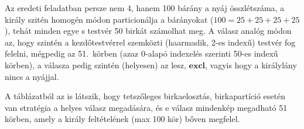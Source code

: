 \documentclass{article}
\newcommand{\just}[1]{\boxed{#1}}%
\newcommand{\excl}{\mathbf{excl}}
\begin{document}
	Az eredeti feladatban persze nem 4, hanem 100 bárány a nyáj összlétszáma, a király szitén homogén módon particionálja a bárányokat ($100 = 25+25+25+25$), tehát minden egye s testvér 50 birkát számolhat meg. A válasz analóg módon az, hogy szintén a kezdőtestvérrel szemközti (haarmadik, 2-es indexű) testvér fog felelni, mégpedig az 51.~körben (azaz 0-alapó indexelés szerinti 50-es indexű körben), a válasza pedig szintén (helyesen) az lesz, $\just\excl$, vagyis hogy a királylány nincs a nyájjal.

	A táblázatból az is látszik, hogy tetszőleges birkaelosztás, birkapartíció esetén van stratégia a helyes válasz megadására, és e válasz mindenkép megadható 51 körben, amely a király feltételének (max 100 kör) bőven megfelel.

	\begin{comment}

	Ilyenfajta, a teendőken egész világosan megmutató táblázatra gondolok:


\end{comment}
\end{document}
